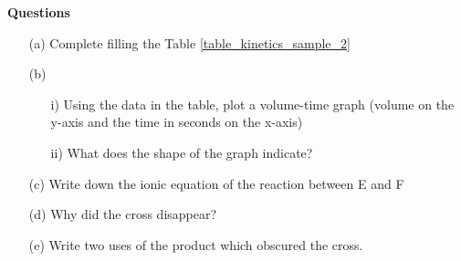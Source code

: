 \noindent \textbf{Questions}
\begin{enumerate}[topsep=0ex,itemsep=0ex,partopsep=1ex,parsep=1ex]
	\item[(a)] Complete filling the Table \ref{table_kinetics_sample_2}
	\item[(b)] 
	\begin{enumerate}[topsep=0ex,itemsep=0ex,partopsep=1ex,parsep=1ex]
		\item[i)] Using the data in the table, plot a volume-time graph (volume on the y-axis and the time in seconds on the x-axis)
		\item[ii)] What does the shape of the graph indicate?
	\end{enumerate}
	\item[(c)] Write down the ionic equation of the reaction between E and F
	\item[(d)] Why did the cross disappear?
	\item[(e)] Write two uses of the product which obscured the cross.
\end{enumerate}







